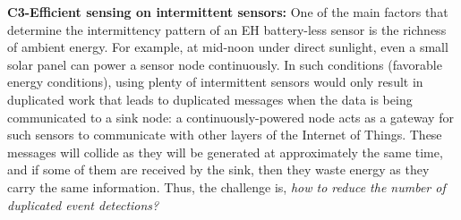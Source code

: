\noindent\textbf{C3-Efficient sensing on intermittent sensors:} 
One of the main factors that determine the intermittency pattern of an EH battery-less sensor is the richness of ambient energy. 
For example, at mid-noon under direct sunlight, even a small solar panel can power a sensor node continuously. 
In such conditions (favorable energy conditions), using plenty of intermittent sensors would only result in duplicated work that leads to duplicated messages when the data is being communicated to a sink node: a continuously-powered node acts as a gateway for such sensors to communicate with other layers of the Internet of Things. These messages will collide as they will be generated at approximately the same time, and if some of them are received by the sink, then they waste energy as they carry the same information. Thus, the challenge is, \emph{how to reduce the number of duplicated event detections?} 
%
